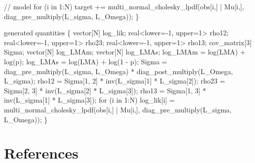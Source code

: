 \documentclass[
  12pt,
  letterpaper,
  DIV=11,
  numbers=noendperiod]{scrartcl}
\newenvironment{Shaded}{\begin{snugshade}}{\end{snugshade}}
\newcommand{\CommentTok}[1]{\textcolor[rgb]{0.37,0.37,0.37}{#1}}
\newcommand{\ControlFlowTok}[1]{\textcolor[rgb]{0.00,0.23,0.31}{#1}}
\newcommand{\DataTypeTok}[1]{\textcolor[rgb]{0.68,0.00,0.00}{#1}}
\newcommand{\DecValTok}[1]{\textcolor[rgb]{0.68,0.00,0.00}{#1}}
\newcommand{\KeywordTok}[1]{\textcolor[rgb]{0.00,0.23,0.31}{#1}}
\newcommand{\NormalTok}[1]{\textcolor[rgb]{0.00,0.23,0.31}{#1}}
\begin{document}
\begin{Shaded}
\begin{Highlighting}[]
  \CommentTok{// model}
  \ControlFlowTok{for}\NormalTok{ (i }\ControlFlowTok{in} \DecValTok{1}\NormalTok{:N)}
     \KeywordTok{target +=}\NormalTok{ multi\_normal\_cholesky\_lpdf(obs[i,] | Mu[i,], diag\_pre\_multiply(L\_sigma, L\_Omega));}
\NormalTok{\}}

\KeywordTok{generated quantities}\NormalTok{ \{}
  \DataTypeTok{vector}\NormalTok{[N] log\_lik;}
  \DataTypeTok{real}\NormalTok{\textless{}}\KeywordTok{lower}\NormalTok{={-}}\DecValTok{1}\NormalTok{, }\KeywordTok{upper}\NormalTok{=}\DecValTok{1}\NormalTok{\textgreater{} rho12;}
  \DataTypeTok{real}\NormalTok{\textless{}}\KeywordTok{lower}\NormalTok{={-}}\DecValTok{1}\NormalTok{, }\KeywordTok{upper}\NormalTok{=}\DecValTok{1}\NormalTok{\textgreater{} rho23;}
  \DataTypeTok{real}\NormalTok{\textless{}}\KeywordTok{lower}\NormalTok{={-}}\DecValTok{1}\NormalTok{, }\KeywordTok{upper}\NormalTok{=}\DecValTok{1}\NormalTok{\textgreater{} rho13;}
  \DataTypeTok{cov\_matrix}\NormalTok{[}\DecValTok{3}\NormalTok{] Sigma;}
  \DataTypeTok{vector}\NormalTok{[N] log\_LMAm;}
  \DataTypeTok{vector}\NormalTok{[N] log\_LMAs;}
\NormalTok{  log\_LMAm = log(LMA) + log(p);}
\NormalTok{  log\_LMAs = log(LMA) + log(}\DecValTok{1}\NormalTok{ {-} p);}
\NormalTok{  Sigma = diag\_pre\_multiply(L\_sigma, L\_Omega)}
\NormalTok{     * diag\_post\_multiply(L\_Omega\textquotesingle{}, L\_sigma);}
\NormalTok{  rho12 = Sigma[}\DecValTok{1}\NormalTok{, }\DecValTok{2}\NormalTok{] * inv(L\_sigma[}\DecValTok{1}\NormalTok{] * L\_sigma[}\DecValTok{2}\NormalTok{]);}
\NormalTok{  rho23 = Sigma[}\DecValTok{2}\NormalTok{, }\DecValTok{3}\NormalTok{] * inv(L\_sigma[}\DecValTok{2}\NormalTok{] * L\_sigma[}\DecValTok{3}\NormalTok{]);}
\NormalTok{  rho13 = Sigma[}\DecValTok{1}\NormalTok{, }\DecValTok{3}\NormalTok{] * inv(L\_sigma[}\DecValTok{1}\NormalTok{] * L\_sigma[}\DecValTok{3}\NormalTok{]);}
  \ControlFlowTok{for}\NormalTok{ (i }\ControlFlowTok{in} \DecValTok{1}\NormalTok{:N)}
\NormalTok{   log\_lik[i] = multi\_normal\_cholesky\_lpdf(obs[i,] | Mu[i,], diag\_pre\_multiply(L\_sigma, L\_Omega));}
\NormalTok{ \}}
\end{Highlighting}
\end{Shaded}

\section*{References}\label{references}
\end{document}
